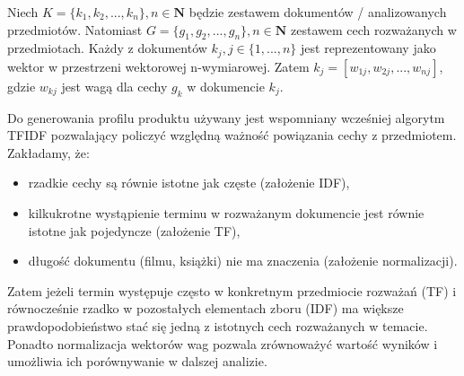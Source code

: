 \documentclass[12pt,a4paper]{report}
\begin{document}
Niech \begin{math} K = \{k_1, k_2,...,k_n\}, n\in{\mathbf{N}} \end{math} będzie zestawem dokumentów / analizowanych przedmiotów. Natomiast \begin{math}G = \{g_1, g_2,...,g_n\}, n\in{\mathbf{N}} \end{math} zestawem cech rozważanych w przedmiotach. Każdy z dokumentów \begin{math} k_j, j\in{\{1,...,n\}} \end{math} jest reprezentowany jako wektor w przestrzeni wektorowej n-wymiarowej. Zatem \begin{math} k_j = [w_{1j}, w_{2j},...,w_{nj}] \end{math}, gdzie \begin{math} w_{kj} \end{math}  jest wagą dla cechy \begin{math} g_k \end{math} w dokumencie  \begin{math} k_j \end{math}.


Do generowania profilu produktu używany jest wspomniany wcześniej algorytm TFIDF pozwalający policzyć względną ważność powiązania cechy z przedmiotem. Zakładamy, że:
\begin{itemize}
\item rzadkie cechy są równie istotne jak częste (założenie IDF),
\item kilkukrotne wystąpienie terminu w rozważanym dokumencie jest równie istotne jak pojedyncze (założenie TF),
\item długość dokumentu (filmu, książki) nie ma znaczenia (założenie normalizacji).  
\end{itemize}
Zatem jeżeli termin występuje często w konkretnym przedmiocie rozważań (TF) i równocześnie rzadko w pozostałych elementach zboru (IDF) ma większe prawdopodobieństwo stać się jedną z istotnych cech rozważanych w temacie. Ponadto normalizacja wektorów wag pozwala zrównoważyć wartość wyników i umożliwia ich porównywanie w dalszej analizie.
\end{document}
